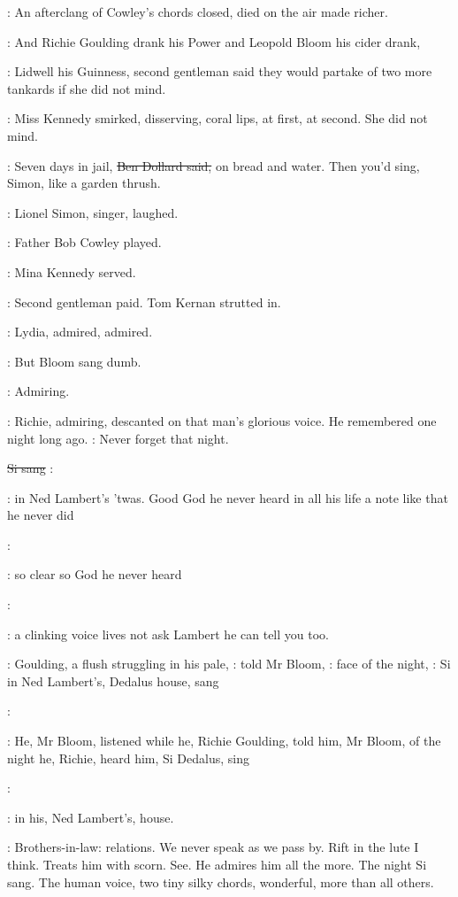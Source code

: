:
An afterclang of Cowley's chords closed,
died on the air
made richer.

:
And Richie Goulding drank his Power and Leopold Bloom his cider
drank,

:
Lidwell his Guinness,
second gentleman said they would partake of
two more tankards if she did not mind.

:
Miss Kennedy smirked,
disserving,
coral lips,
at first,
at second.
She did not mind.

\dollard:
Seven days in jail,
\sout{Ben Dollard said,}
on bread and water.
Then you'd
sing,
Simon,
like a garden thrush.

:
Lionel Simon,
singer,
laughed.

:
Father Bob Cowley played.

:
Mina Kennedy served.

:
Second gentleman paid.
Tom Kernan strutted in.

:
Lydia,
admired,
admired.

:
But Bloom sang dumb.

:
Admiring.

:
Richie,
admiring,
descanted on that man's glorious voice.
He
remembered one night long ago.
\BloomInt:
Never forget that night.

\sout{Si sang}
\simon:

\BloomInt:
in Ned Lambert's 'twas.
Good God he never heard in all his
life a note like that he never did

\simon:

\BloomInt:
so clear so God he never heard

\simon:

\BloomInt:
a clinking voice lives
not ask Lambert he can tell you too.

:
Goulding,
a flush struggling in his pale,
:
told Mr Bloom,
:
face of the night,
\goulding:
Si in Ned Lambert's,
Dedalus house,
sang

\simon:

:
He,
Mr Bloom,
listened while he,
Richie Goulding,
told him,
Mr
Bloom,
of the night he,
Richie,
heard him,
Si Dedalus,
sing

\simon:

:
in his,
Ned Lambert's,
house.

\BloomInt:
Brothers-in-law:
relations.
We never speak as we pass by.
Rift in the
lute I think.
Treats him with scorn.
See.
He admires him all the more.
The
night Si sang.
The human voice,
two tiny silky chords,
wonderful,
more
than all others.

